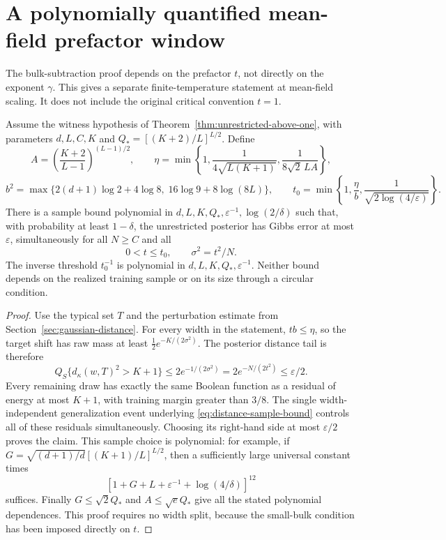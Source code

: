\section{A polynomially quantified mean-field prefactor window}
\label{sec:small-prefactor}

The bulk-subtraction proof depends on the prefactor $t$, not directly
on the exponent $\gamma$. This gives a separate finite-temperature
statement at mean-field scaling. It does not include the original
critical convention $t=1$.

\begin{theorem}
\label{thm:small-meanfield-prefactor}
Assume the witness hypothesis of
Theorem~\ref{thm:unrestricted-above-one}, with parameters $d,L,C,K$
and $Q_*=[(K+2)/L]^{L/2}$. Define
\[
 A=\left(\frac{K+2}{L-1}\right)^{(L-1)/2},\qquad
 \eta=\min\left\{1,\frac1{4\sqrt{L(K+1)}},
                         \frac1{8\sqrt2\,LA}\right\},
\]
\[
 b^2=\max\{2(d+1)\log2+4\log8,\;16\log9+8\log(8L)\},
\qquad
 t_0=\min\left\{1,\frac\eta b,
                    \frac1{\sqrt{2\log(4/\varepsilon)}}\right\}.
\]
There is a sample bound polynomial in
$d,L,K,Q_*,\varepsilon^{-1},\log(2/\delta)$ such that, with probability
at least $1-\delta$, the unrestricted posterior has Gibbs error at most
$\varepsilon$, simultaneously for all $N\ge C$ and all
\[
 0<t\le t_0,\qquad \sigma^2=t^2/N.
\]
The inverse threshold $t_0^{-1}$ is polynomial in
$d,L,K,Q_*,\varepsilon^{-1}$. Neither bound depends on the realized
training sample or on its size through a circular condition.
\end{theorem}

\begin{proof}
Use the typical set $T$ and the perturbation estimate from
Section~\ref{sec:gaussian-distance}. For every width in the statement,
$tb\le\eta$, so the target shift has raw mass at least
$\frac12e^{-K/(2\sigma^2)}$. The posterior distance tail is therefore
\[
 Q_S\{d_\kappa(w,T)^2>K+1\}
 \le2e^{-1/(2\sigma^2)}
 =2e^{-N/(2t^2)}\le\varepsilon/2.
\]
Every remaining draw has exactly the same Boolean function as a
residual of energy at most $K+1$, with training margin greater than
$3/8$. The single width-independent generalization event underlying
\eqref{eq:distance-sample-bound} controls all of these residuals
simultaneously. Choosing its right-hand side at most $\varepsilon/2$
proves the claim. This sample choice is polynomial: for example, if
$G=\sqrt{(d+1)/d}[(K+1)/L]^{L/2}$, then a sufficiently large universal
constant times
\[
 [1+G+L+\varepsilon^{-1}+\log(4/\delta)]^{12}
\]
suffices. Finally $G\le\sqrt2Q_*$ and $A\le\sqrt eQ_*$ give all the
stated polynomial dependences. This proof requires no width split,
because the small-bulk condition has been imposed directly on $t$.
\end{proof}

